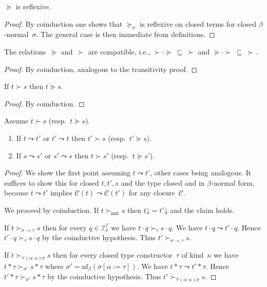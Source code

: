 \documentclass[a4paper,UKenglish,cleveref,autoref,numberwithinsect]{lipics-v2019}
\theoremstyle{definition}
\newcommand{\Iterms}{\mathcal{I}}
\newcommand{\arrtype}{\rightarrow}
\newcommand{\app}[2]{#1 \cdot #2}
\newcommand{\tapp}[2]{#1 * #2}
\newcommand{\subst}[2]{#1:=#2}
\newcommand{\nat}{\mathtt{nat}}
\newcommand{\cl}{\mathcal{C}}
\newcommand{\nf}{\mathrm{nf}}
\newcommand{\da}{\mathord{\downarrow}}
\begin{document}
\begin{lemma}\label{lem_reflexive}
  $\succeq$ is reflexive.
\end{lemma}

\begin{proof}
  By coinduction one shows that $\succeq_\sigma$ is reflexive on
  closed terms for closed $\beta$-normal~$\sigma$. The general case is
  then immediate from definitions.
\end{proof}

\begin{lemma}\label{lem:compatibility}
  The relations~$\succeq$ and~$\succ$ are compatible, i.e., $\succ
  \cdot \succeq\ \subseteq\ \succ$ and $\succeq \cdot
  \succ\ \subseteq\ \succ$.
\end{lemma}

\begin{proof}
  By coinduction, analogous to the transitivity proof.
\end{proof}

\begin{lemma}\label{lem_succ_to_succeq}
  If $t \succ s$ then $t \succeq s$.
\end{lemma}

\begin{proof}
  By coinduction.
\end{proof}

\begin{lemma}\label{lem_succ_red}
  Assume $t \succ s$ (resp.~$t \succeq s$).
  \begin{enumerate}
  \item If $t \leadsto t'$ or $t' \leadsto t$ then $t' \succ s$
    (resp.~$t' \succeq s$).
  \item If $s \leadsto s'$ or $s' \leadsto s$ then $t \succ s'$
    (resp.~$t \succeq s'$).
  \end{enumerate}
\end{lemma}

\begin{proof}
  We show the first point assuming $t \leadsto t'$, other cases being
  analogous. It suffices to show this for closed $t,t',s$ and the type
  closed and in $\beta$-normal form, because $t \leadsto t'$ implies
  $\cl(t) \leadsto \cl(t')$ for any closure~$\cl$.

  We proceed by coinduction. If $t \succ_\nat s$ then $t\da = t'\da$
  and the claim holds.

  If $t \succ_{\sigma\arrtype\tau} s$ then for every $q \in
  \Iterms^f_\sigma$ we have $\app{t}{q} \succ_\tau \app{s}{q}$. We
  have $\app{t}{q} \leadsto \app{t'}{q}$. Hence $\app{t'}{q}
  \succ_\tau \app{s}{q}$ by the coinductive hypothesis. Thus $t'
  \succ_{\sigma\arrtype\tau} s$.

  If $t \succ_{\forall(\alpha:\kappa)\sigma} s$ then for every closed
  type constructor~$\tau$ of kind~$\kappa$ we have $\tapp{t}{\tau}
  \succ_{\sigma'} \tapp{s}{\tau}$ where $\sigma' =
  \nf_\beta(\sigma[\subst{\alpha}{\tau}])$. We have $\tapp{t}{\tau}
  \leadsto \tapp{t'}{\tau}$. Hence $\tapp{t'}{\tau} \succ_{\sigma'}
  \tapp{s}{\tau}$ by the coinductive hypothesis. Thus $t'
  \succ_{\forall(\alpha:\kappa)\sigma} s$.
\end{proof}
\end{document}
